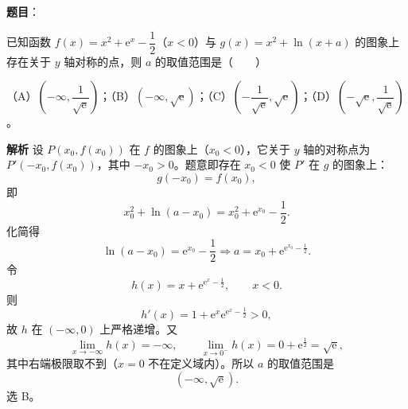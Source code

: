 \begin{answer}

\textbf{题目}：

已知函数 $f(x)=x^2+\mathrm e^x-\dfrac12$（$x<0$）与 $g(x)=x^2+\ln(x+a)$ 的图象上存在关于 $y$ 轴对称的点，则 $a$ 的取值范围是\mbox{（　　）}

（A）$\left(-\infty,\dfrac1{\sqrt{\mathrm e}}\right)$；（B）$(-\infty,\sqrt{\mathrm e})$；（C）$\left(-\dfrac1{\sqrt{\mathrm e}},\sqrt{\mathrm e}\right)$；（D）$\left(-\sqrt{\mathrm e},\dfrac1{\sqrt{\mathrm e}}\right)$。

\textbf{解析}
设 $P(x_0,f(x_0))$ 在 $f$ 的图象上（$x_0<0$），它关于 $y$ 轴的对称点为 $P'(-x_0,f(x_0))$，其中 $-x_0>0$。题意即存在 $x_0<0$ 使 $P'$ 在 $g$ 的图象上：
\nopagebreak[4]
\[g(-x_0)=f(x_0),\]
即
\nopagebreak[4]
\[x_0^2+\ln(a-x_0)=x_0^2+\mathrm e^{x_0}-\frac12 .\]
化简得
\nopagebreak[4]
\[\ln(a-x_0)=\mathrm e^{x_0}-\frac12\Longrightarrow a=x_0+\mathrm e^{\mathrm e^{x_0}-\frac12}.\]
令
\nopagebreak[4]
\[h(x)=x+\mathrm e^{\mathrm e^x-\frac12},\qquad x<0 .\]
则
\nopagebreak[4]
\[h'(x)=1+\mathrm e^x\mathrm e^{\mathrm e^x-\frac12}>0,\]
故 $h$ 在 $(-\infty,0)$ 上严格递增。又
\nopagebreak[4]
\[\lim_{x\to-\infty}h(x)=-\infty,\qquad \lim_{x\to0^-}h(x)=0+\mathrm e^{\frac12}=\sqrt{\mathrm e},\]
其中右端极限取不到（$x=0$ 不在定义域内）。所以 $a$ 的取值范围是
\nopagebreak[4]
\[\left(-\infty,\sqrt{\mathrm e}\right).\]
选 B。


\end{answer}
